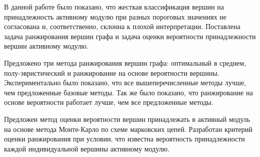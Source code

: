 \startconclusionpage

В данной работе было показано, что жесткая классификация вершин на
принадлежность активному модулю при разных пороговых значениях не согласована
и, соответственно, склонна к плохой интерпретации.  Поставлена задача
ранжирования вершин графа и задача оценки вероятности принадлежности вершин
активному модулю.

Предложено три метода ранжирования вершин графа: оптимальный в среднем,
полу-эвристический и ранжирование на основе вероятности вершины.
Экспериментально было показано, что все вышеперечисленные методы лучше, чем
предложенные базовые методы. Так же было показано, что ранжирование на основе
вероятности работает лучше, чем все предложенные методы.

Предложен метод оценки вероятности вершин принадлежать в активный модуль на
основе метода Монте-Карло по схеме марковских цепей.  Разработан критерий
оценки ранжирования при условии, что известна вероятность принадлежности каждой
индивидуальной вершины активному модулю.
